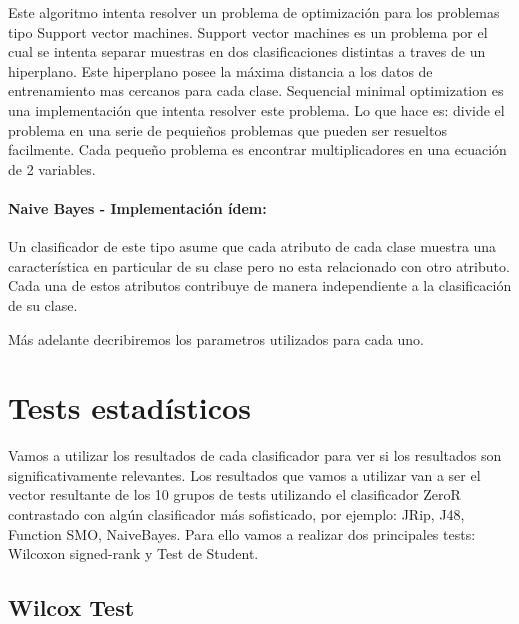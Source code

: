 \documentclass[11pt,a4paper,twoside]{tesis}
\begin{document}

Este algoritmo intenta resolver un problema de optimización para los problemas tipo Support vector machines. Support vector machines es un problema por el cual se intenta separar muestras en dos clasificaciones distintas a traves de un hiperplano. Este hiperplano posee la máxima distancia a los datos de entrenamiento mas cercanos para cada clase. Sequencial minimal optimization es una implementación que intenta resolver este problema. Lo que hace es: divide el problema en una serie de pequieños problemas que pueden ser resueltos facilmente. Cada pequeño problema es encontrar multiplicadores en una ecuación de 2 variables. 

\paragraph{Naive Bayes - Implementación ídem:}


Un clasificador de este tipo asume que cada atributo de cada clase muestra una característica en particular de su clase pero no esta relacionado con otro atributo. Cada una de estos atributos contribuye de manera independiente a la clasificación de su clase. 


Más adelante decribiremos los parametros utilizados para cada uno.

\section{Tests estadísticos}

Vamos a utilizar los resultados de cada clasificador para ver si los resultados son significativamente relevantes. Los resultados que vamos a utilizar van a ser el vector resultante de los 10 grupos de tests utilizando el clasificador ZeroR contrastado con algún clasificador más sofisticado, por ejemplo: JRip, J48, Function SMO, NaiveBayes.
Para ello vamos a realizar dos principales tests: Wilcoxon signed-rank y Test de Student. 

\subsection{Wilcox Test}
\end{document}
